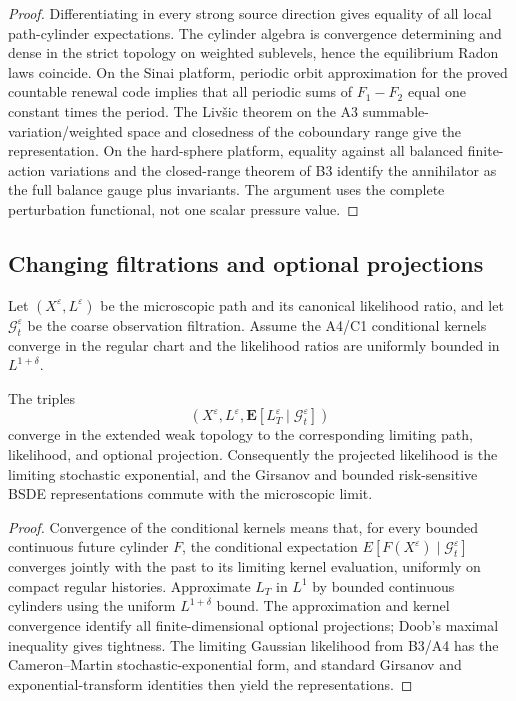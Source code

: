 \begin{proof}
Differentiating in every strong source direction gives equality of all local
path-cylinder expectations.  The cylinder algebra is convergence determining
and dense in the strict topology on weighted sublevels, hence the equilibrium
Radon laws coincide.  On the Sinai platform, periodic orbit approximation for
the proved countable renewal code implies that all periodic sums of
$F_1-F_2$ equal one constant times the period.  The Livšic theorem on the
A3 summable-variation/weighted space and closedness of the coboundary range
give the representation.  On the hard-sphere platform, equality against all
balanced finite-action variations and the closed-range theorem of B3 identify
the annihilator as the full balance gauge plus invariants.  The argument uses
the complete perturbation functional, not one scalar pressure value.
\end{proof}

\subsection{Changing filtrations and optional projections}

Let $(X^\varepsilon,L^\varepsilon)$ be the microscopic path and its
canonical likelihood ratio, and let
$\mathcal G_t^\varepsilon$ be the coarse observation filtration.  Assume
the A4/C1 conditional kernels converge in the regular chart and the likelihood
ratios are uniformly bounded in $L^{1+\delta}$.

\begin{theorem}
\label{thm:r17-c2-optional}
The triples
\[
 \left(X^\varepsilon,L^\varepsilon,
  \mathbf E[L_T^\varepsilon\mid\mathcal G_t^\varepsilon]
 \right)
\]
converge in the extended weak topology to the corresponding limiting path,
likelihood, and optional projection.  Consequently the projected likelihood
is the limiting stochastic exponential, and the Girsanov and bounded
risk-sensitive BSDE representations commute with the microscopic limit.
\end{theorem}

\begin{proof}
Convergence of the conditional kernels means that, for every bounded
continuous future cylinder $F$, the conditional expectation
$E[F(X^\varepsilon)\mid\mathcal G_t^\varepsilon]$ converges
jointly with the past to its limiting kernel evaluation, uniformly on compact
regular histories.  Approximate $L_T$ in $L^1$ by bounded continuous
cylinders using the uniform $L^{1+\delta}$ bound.  The approximation and
kernel convergence identify all finite-dimensional optional projections;
Doob's maximal inequality gives tightness.  The limiting Gaussian likelihood
from B3/A4 has the Cameron--Martin stochastic-exponential form, and standard
Girsanov and exponential-transform identities then yield the representations.
\end{proof}

